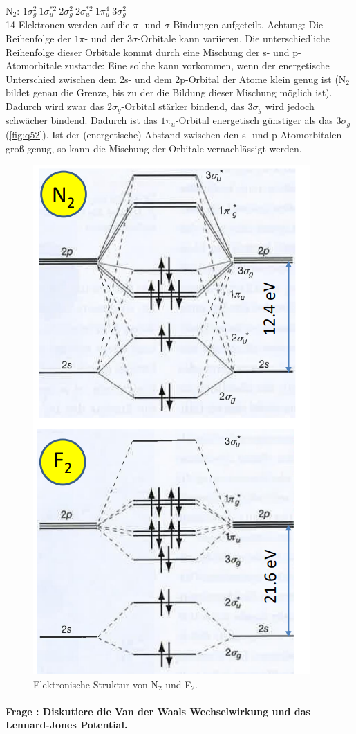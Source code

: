 \documentclass[a4paper, 11pt, ngerman, parskip=half-]{scrartcl}
\newcounter{question}
\newcommand{\question}[1]{\stepcounter{question}\paragraph{Frage \thequestion: #1}~}
\begin{document}
N$_2$: $1\sigma_g^2 ~ 1\sigma_u^{*2} ~ 2\sigma_g^2 ~ 2\sigma_u^{*2} ~ 1\pi_u^4 ~ 3\sigma_g^2$ \\
14 Elektronen werden auf die $\pi$- und $\sigma$-Bindungen aufgeteilt. Achtung: Die Reihenfolge der $1\pi$- und der $3\sigma$-Orbitale kann variieren. Die unterschiedliche Reihenfolge dieser Orbitale kommt durch eine Mischung der s- und p-Atomorbitale zustande: Eine solche kann vorkommen, wenn der energetische Unterschied zwischen dem 2s- und dem 2p-Orbital der Atome klein genug ist (N$_2$ bildet genau die Grenze, bis zu der die Bildung dieser Mischung möglich ist). Dadurch wird zwar das $2\sigma_g$-Orbital stärker bindend, das $3\sigma_g$ wird jedoch schwächer bindend. Dadurch ist das $1\pi_u$-Orbital energetisch günstiger als das $3\sigma_g$ (\autoref{fig:q52}). Ist der (energetische) Abstand zwischen den s- und p-Atomorbitalen groß genug, so kann die Mischung der Orbitale vernachlässigt werden.

\begin{figure}[H]  
    \centering
    \includegraphics[width=.4\textwidth]{resources/24-03-2015/N2-F2.png}
    \caption{Elektronische Struktur von N$_2$ und F$_2$.}
    \label{fig:q52}
\end{figure}


\question{Diskutiere die Van der Waals Wechselwirkung und das Lennard-Jones Potential.}
\label{q:53}
\end{document}
